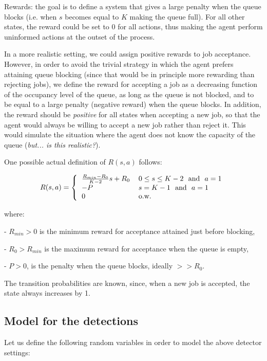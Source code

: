 \documentclass[11pt,A4paper]{article}
\begin{document}
\smallskip
Rewards: the goal is to define a system that gives a large penalty when the queue blocks (i.e. when $s$ becomes equal to $K$ making the queue full). For all other states, the reward could be set to 0 for all actions, thus making the agent perform uninformed actions at the outset of the process.

In a more realistic setting, we could assign positive rewards to job acceptance. However, in order to avoid the trivial strategy in which the agent prefers attaining queue blocking (since that would be in principle more rewarding than rejecting jobs), we define the reward for accepting a job as a decreasing function of the occupancy level of the queue, as long as the queue is not blocked, and to be equal to a large penalty (negative reward) when the queue blocks. In addition, the reward should be \emph{positive} for all states when accepting a new job, so that the agent would always be willing to accept a new job rather than reject it. This would simulate the situation where the agent does not know the capacity of the queue (\emph{but... is this realistic?}).

\smallskip
One possible actual definition of $R(s,a)$ follows:

\[ \\
R(s,a) =
\left \{
  \begin{tabular}{ll}
  $\frac{ R_{min} - R_0 }{K-2} s + R_0$ & $0 \leq s \leq K-2$ \textrm{ and } $a = 1$ \\
  $-P$ & $s = K-1$ \textrm{ and } $a = 1$ \\
  $0$ & \textrm{o.w.} \\
  \end{tabular}
\right.
\]

where:

- $R_{min} > 0$ is the minimum reward for acceptance attained just before blocking,

- $R_{0} > R_{min}$ is the maximum reward for acceptance when the queue is empty,

- $P>0$, is the penalty when the queue blocks, ideally $>> R_0$.

\bigskip
The transition probabilities are known, since, when a new job is accepted, the state always increases by 1.


\newpage





\iffalse


\newpage
\subsection{Model for the detections}
\medskip
Let us define the following random variables in order to model the above detector settings:
\end{document}

